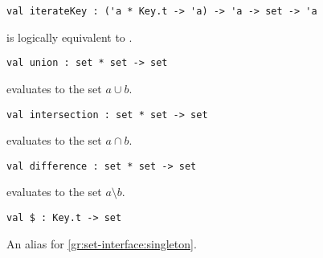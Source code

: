 \begin{gram}[iterateKey]
\begin{verbatim}
val iterateKey : ('a * Key.t -> 'a) -> 'a -> set -> 'a
\end{verbatim}
 is logically equivalent to .
\end{gram}

\begin{gram}[union]
\begin{verbatim}
val union : set * set -> set
\end{verbatim}
 evaluates to the set $a \cup b$.
\end{gram}

\begin{gram}[intersection]
\begin{verbatim}
val intersection : set * set -> set
\end{verbatim}
 evaluates to the set $a \cap b$.
\end{gram}

\begin{gram}[difference]
\begin{verbatim}
val difference : set * set -> set
\end{verbatim}
 evaluates to the set $a \setminus b$.
\end{gram}

\begin{gram}[\$]
\begin{verbatim}
val $ : Key.t -> set
\end{verbatim}
An alias for \ref{gr:set-interface:singleton}.
\end{gram}



